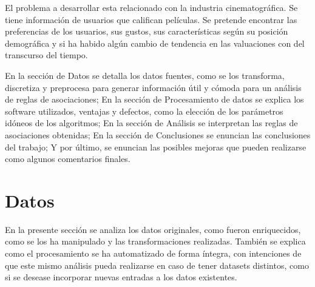 \documentclass[journal]{IEEEtran}
\begin{document}
El problema a desarrollar esta relacionado con la industria cinematográfica.
Se tiene información de usuarios que califican películas. Se pretende encontrar
las preferencias de los usuarios, sus gustos, sus características según su
posición demográfica y si ha habido algún cambio de tendencia en las valuaciones
con del transcurso del tiempo.

En la sección de Datos se detalla los datos fuentes, como se los transforma,
discretiza y preprocesa para generar información útil y cómoda para un análisis
de reglas de asociaciones; En la sección de Procesamiento de datos se 
explica los software utilizados, ventajas y defectos, como la elección de los
parámetros idóneos de los algoritmos; En la sección de Análisis se interpretan
las reglas de asociaciones obtenidas; En la sección de Conclusiones se enuncian
las conclusiones del trabajo; Y por último, se enuncian las posibles mejoras
que pueden realizarse como algunos comentarios finales.



\section{Datos}
En la presente sección se analiza los datos originales, como fueron enriquecidos,
como se los ha manipulado y las transformaciones realizadas. También se explica como 
el procesamiento se ha automatizado 
de forma íntegra, con intenciones de que este mismo análisis 
pueda realizarse en caso de tener datasets distintos, como si se desease incorporar
nuevas entradas a los datos existentes.
\end{document}
